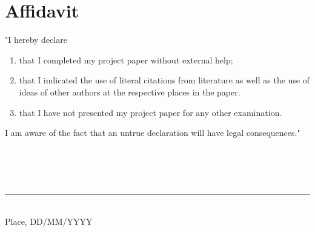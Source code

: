 
\newpage
{} %


\printbibliography[nottype=online,heading=literatur]
\printbibliography[type=online,heading=www]


\newpage
\pagestyle{empty}

\section*{Affidavit}

\vspace{0.5cm}

"I hereby declare\\

\begin{enumerate}
	\item that I completed my project paper without external help;
	\item that I indicated the use of literal citations from literature as
	      well as the use of ideas of other authors at the respective
	      places in the paper.
	\item that I have not presented my project paper for any other
	      examination.
\end{enumerate}

I am aware of the fact that an untrue declaration will have legal
consequences."
\\
\\
\\
\\
\\
\rule{0.5\textwidth}{1pt}
\\
Place, DD/MM/YYYY



